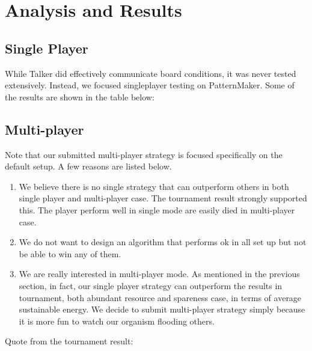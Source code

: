 \section{Analysis and Results}
\label{sec:analysis}
\subsection{Single Player}
While Talker did effectively communicate board conditions, it was never tested extensively.  Instead, we focused singleplayer testing on PatternMaker.  Some of the results are shown in the table below:

\subsection{Multi-player}
Note that our submitted multi-player strategy is focused specifically on the default setup.
A few reasons are listed below.
\begin{enumerate}
  \item We believe there is no single strategy that can outperform others in both single player and multi-player case. The tournament result strongly supported this. The player perform well in single mode are easily died in multi-player case.
  \item We do not want to design an algorithm that performs ok in all set up but not be able to win any of them.
  \item We are really interested in multi-player mode. 
  As mentioned in the previous section, in fact, our single player strategy can outperform the results in tournament, both abundant resource and spareness case, in terms of average sustainable energy. We decide to submit multi-player strategy simply because it is more fun to watch our organism flooding others.
\end{enumerate}

Quote from the tournament result:

